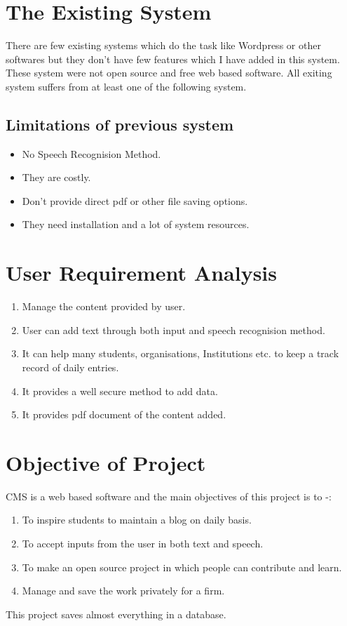 \section{The Existing System}
There are few existing systems which do the task like Wordpress or other softwares but
they don't have few features which I have added in this system. These system were not open source
and free web based software.
All exiting system suffers from at least one of the following system.
 \subsection{Limitations of previous system }
\begin{itemize}
\item No Speech Recognision Method. 

\item They are costly.

\item Don't provide direct pdf or other file saving options.

\item They need installation and a lot of system resources. 

\end{itemize}
\section{User Requirement Analysis}
\begin{enumerate}
\item Manage the content provided by user.
\item User can add text through both input and speech recognision method.
\item It can help many students, organisations, Institutions etc. to keep a track record of daily entries.
\item It provides a well secure method to add data.
\item It provides pdf document of the content added.
\end{enumerate}

\section{Objective of Project}
CMS is a web based software and the 
main objectives of this project is to -:
\begin{enumerate}
\item To inspire students to maintain a blog on daily basis. 
\item To accept inputs from the user in both text and speech.
\item To make an open source project in which people can contribute and learn.
\item Manage and save the work privately for a firm.
\end{enumerate}
This project saves almost everything in a database.

\newpage


